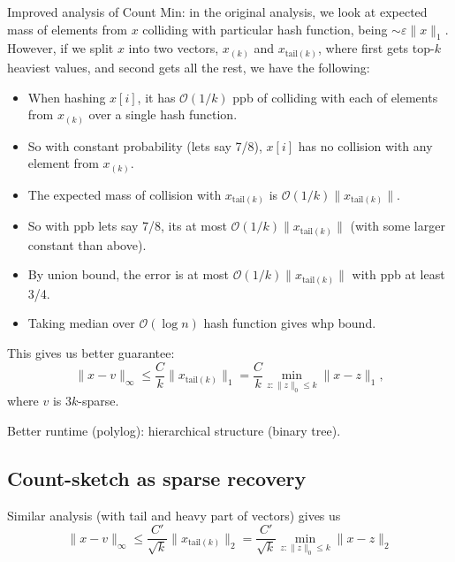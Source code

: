 \documentclass[11pt]{article}
\newcommand{\bigo}{\mathcal{O}}
\begin{document}
Improved analysis of Count Min: in the original analysis, we look at expected mass of elements from $x$ colliding with particular hash function, being $\sim \varepsilon \|x\|_1$. However, if we split $x$ into two vectors, $x_{(k)}$ and $x_{\text{tail}(k)}$, where first gets top-$k$ heaviest values, and second gets all the rest, we have the following:
\begin{itemize}
\item When hashing $x[i]$, it has $\bigo(1/k)$ ppb of colliding with each of elements from $x_{(k)}$ over a single hash function.
\item So with constant probability (lets say 7/8), $x[i]$ has no collision with any element from $x_{(k)}$.
\item The expected mass of collision with $x_{\text{tail}(k)}$ is $\bigo(1/k) \|x_{\text{tail}(k)}\|$.
\item So with ppb lets say 7/8, its at most $\bigo(1/k) \|x_{\text{tail}(k)}\|$ (with some larger constant than above).
\item By union bound, the error is at most $\bigo(1/k) \|x_{\text{tail}(k)}\|$ with ppb at least 3/4.
\item Taking median over $\bigo(\log n)$ hash function gives whp bound.
\end{itemize}

This gives us better guarantee:
$$ \|x-v\|_\infty \le  \frac{C}{k} \|x_{\text{tail}(k)}\|_1 = \frac{C}{k} \min_{z : \|z\|_0 \le k} \|x-z\|_1,$$
where $v$ is $3k$-sparse.


Better runtime (polylog): hierarchical structure (binary tree).


\subsection{Count-sketch as sparse recovery}
Similar analysis (with tail and heavy part of vectors) gives us
$$ \|x - v\|_\infty \le \frac{C'}{\sqrt{k}} \|x_{\text{tail}(k)}\|_2 =  \frac{C'}{\sqrt{k}} \min_{z : \|z\|_0 \le k} \|x-z\|_2$$
\end{document}
